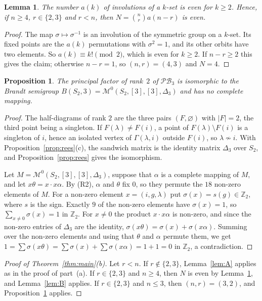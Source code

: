 \documentclass[11pt]{article}
\newtheorem{lemma}[theorem]{Lemma}
\newtheorem{proposition}[theorem]{Proposition}
\theoremstyle{remark}
\newcommand{\PB}{\mathcal{PB}}
\newcommand{\M}{\mathcal M}
\newcommand{\Z}{\mathbb Z}
\begin{document}
\begin{lemma}\label{lem:pbparity}
The number $a(k)$ of involutions of a $k$-set is even for $k\ge2$. Hence, if
$n\ge4$, $r\in\{2,3\}$ and $r<n$, then $N=\binom nr a(n-r)$ is even.
\end{lemma}

\begin{proof}
The map $\sigma\mapsto\sigma^{-1}$ is an involution of the symmetric group on a
$k$-set. Its fixed points are the $a(k)$ permutations with $\sigma^2=1$, and
its other orbits have two elements. So $a(k)\equiv k!\pmod2$, which is even
for $k\ge2$. If $n-r\ge2$ this gives the claim; otherwise $n-r=1$, so
$(n,r)=(4,3)$ and $N=4$.
\end{proof}

\begin{proposition}\label{prop:pb3}
The principal factor of rank~$2$ of $\PB_3$ is isomorphic to the Brandt
semigroup $B(S_2,3)=\M^0(S_2,[3],[3],\Delta_3)$ and has no complete mapping.
\end{proposition}

\begin{proof}
The half-diagrams of rank $2$ are the three pairs $(F,\varnothing)$ with
$|F|=2$, the third point being a singleton. If $F(\lambda)\ne F(i)$, a point of
$F(\lambda)\setminus F(i)$ is a singleton of $i$, hence an isolated vertex of
$\Gamma(\lambda,i)$ outside $F(i)$, so $\lambda\not\sim i$. With
Proposition~\ref{prop:rees}(c), the sandwich matrix is the identity matrix
$\Delta_3$ over $S_2$, and Proposition~\ref{prop:rees} gives the isomorphism.

Let $M=\M^0(S_2,[3],[3],\Delta_3)$, suppose that $\alpha$ is a complete
mapping of $M$, and let $x\theta=x\cdot x\alpha$. By (R2), $\alpha$ and $\theta$
fix $0$, so they permute the $18$ non-zero elements of $M$. For a non-zero
element $x=(i,g,\lambda)$ put $\sigma(x)=s(g)\in\Z_2$, where $s$ is the sign.
Exactly $9$ of the non-zero elements have $\sigma(x)=1$, so
$\sum_{x\ne0}\sigma(x)=1$ in $\Z_2$. For $x\ne0$ the product $x\cdot x\alpha$
is non-zero, and since the non-zero entries of $\Delta_3$ are the identity,
$\sigma(x\theta)=\sigma(x)+\sigma(x\alpha)$. Summing over the non-zero elements
and using that $\theta$ and $\alpha$ permute them, we get
$1=\sum\sigma(x\theta)=\sum\sigma(x)+\sum\sigma(x\alpha)=1+1=0$ in $\Z_2$, a
contradiction.
\end{proof}

\begin{proof}[Proof of Theorem~\ref{thm:main}(b)]
Let $r<n$. If $r\notin\{2,3\}$, Lemma~\ref{lem:A} applies as in the proof of
part~(a). If $r\in\{2,3\}$ and $n\ge4$, then $N$ is even by
Lemma~\ref{lem:pbparity}, and Lemma~\ref{lem:B} applies. If $r\in\{2,3\}$ and
$n\le3$, then $(n,r)=(3,2)$, and Proposition~\ref{prop:pb3} applies.
\end{proof}
\end{document}
